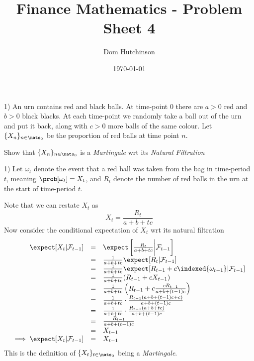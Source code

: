 \documentclass[11pt,a4paper]{article}
\begin{document}
\questionsfalse
\answersfalse

\title{Finance Mathematics - Problem Sheet 4}
\author{Dom Hutchinson}
\date{\today}
\maketitle


\begin{question}{1)}
  An urn contains red and black balls. At time-point 0 there are $a>0$ red and $b>0$ black blacks. At each time-point we randomly take a ball out of the urn and put it back, along with $c>0$ more balls of the same colour. Let $\{X_n\}_{n\in\nats_0}$ be the proportion of red balls at time point $n$.
  \par Show that $\{X_n\}_{n\in\nats_0}$ is a \textit{Martingale} wrt its \textit{Natural Filtration}
\end{question}

\begin{answer}{1)}
  Let $\omega_t$ denote the event that a red ball was taken from the bag in time-period $t$, meaning $\prob[\omega_t]=X_t$, and $R_t$ denote the number of red balls in the urn at the start of time-period $t$.
  \par Note that we can restate $X_t$ as
  \[ X_t=\frac{R_t}{a+b+tc} \]
  Now consider the conditional expectation of $X_t$ wrt its natural filtration
  \[\begin{array}{rcl}
    \expect[X_t|\mathcal{F}_{t-1}]&=&\expect\left[\frac{R_t}{a+b+tc}\bigg|\mathcal{F}_{t-1}\right]\\
    &=&\frac1{a+b+tc}\expect[R_t|\mathcal{F}_{t-1}]\\
    &=&\frac1{a+b+tc}\expect[R_{t-1}+c\indexed\{\omega_{t-1}\}|\mathcal{F}_{t-1}]\\
    &=&\frac1{a+b+tc}(R_{t-1}+cX_{t-1})\\
    &=&\frac1{a+b+tc}\left(R_{t-1}+c\frac{cR_{t-1}}{a+b+(t-1)c}\right)\\
    &=&\frac1{a+b+tc}\cdot\frac{R_{t-1}(a+b+(t-1)c+c)}{a+b+(t-1)c}\\
    &=&\frac1{a+b+tc}\cdot\frac{R_{t-1}(a+b+tc)}{a+b+(t-1)c}\\
    &=&\frac{R_{t-1}}{a+b+(t-1)c}\\
    &=&X_{t-1}\\
    \implies\expect[X_t|\mathcal{F}_{t-1}]&=&X_{t-1}
  \end{array}\]
  This is the definition of $\{X_t\}_{t\in\nats_0}$ being a \textit{Martingale}.
\end{answer}
\end{document}
